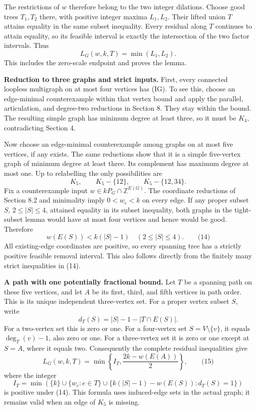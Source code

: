 \documentclass{article}
\begin{document}
The restrictions of \(w\) therefore belong to the two integer dilations. Choose good trees \(T_1,T_2\) there, with positive integer maxima \(L_1,L_2\). Their lifted union \(T\) attains equality in the same subset inequality. Every residual along \(T\) continues to attain equality, so its feasible interval is exactly the intersection of the two factor intervals. Thus \[
L_G(w,k,T)=\min(L_1,L_2).
\] This includes the zero-scale endpoint and proves the lemma.

\textbf{Reduction to three graphs and strict inputs.} First, every connected loopless multigraph on at most four vertices has (IG). To see this, choose an edge-minimal counterexample within that vertex bound and apply the parallel, articulation, and degree-two reductions in Section 8. They stay within the bound. The resulting simple graph has minimum degree at least three, so it must be \(K_4\), contradicting Section 4.

Now choose an edge-minimal counterexample among graphs on at most five vertices, if any exists. The same reductions show that it is a simple five-vertex graph of minimum degree at least three. Its complement has maximum degree at most one. Up to relabelling the only possibilities are \[
K_5,\qquad K_5-\{12\},\qquad K_5-\{12,34\}.
\] Fix a counterexample input \(w\in kP_G\cap\mathbb Z^{E(G)}\). The coordinate reductions of Section 8.2 and minimality imply \(0\lt w_e\lt k\) on every edge. If any proper subset \(S\), \(2\le |S|\le4\), attained equality in its subset inequality, both graphs in the tight-subset lemma would have at most four vertices and hence would be good. Therefore \[
w(E(S))\lt k(|S|-1)
\quad(2\le |S|\le4).\qquad\text{(14)}
\] All existing-edge coordinates are positive, so every spanning tree has a strictly positive feasible removal interval. This also follows directly from the finitely many strict inequalities in (14).

\textbf{A path with one potentially fractional bound.} Let \(T\) be a spanning path on these five vertices, and let \(A\) be its first, third, and fifth vertices in path order. This is its unique independent three-vertex set. For a proper vertex subset \(S\), write \[
d_T(S)=|S|-1-|T\cap E(S)|.
\] For a two-vertex set this is zero or one. For a four-vertex set \(S=V\setminus\{v\}\), it equals \(\deg_T(v)-1\), also zero or one. For a three-vertex set it is zero or one except at \(S=A\), where it equals two. Consequently the complete residual inequalities give \[
L_G(w,k,T)=\min\!\left\{I_T,\frac{2k-w(E(A))}{2}\right\},\qquad\text{(15)}
\] where the integer \[
I_T=\min\!\left(
\{k\}\cup\{w_e:e\in T\}
\cup\{k(|S|-1)-w(E(S)):d_T(S)=1\}
\right)
\] is positive under (14). This formula uses induced-edge sets in the actual graph; it remains valid when an edge of \(K_5\) is missing.
\end{document}
